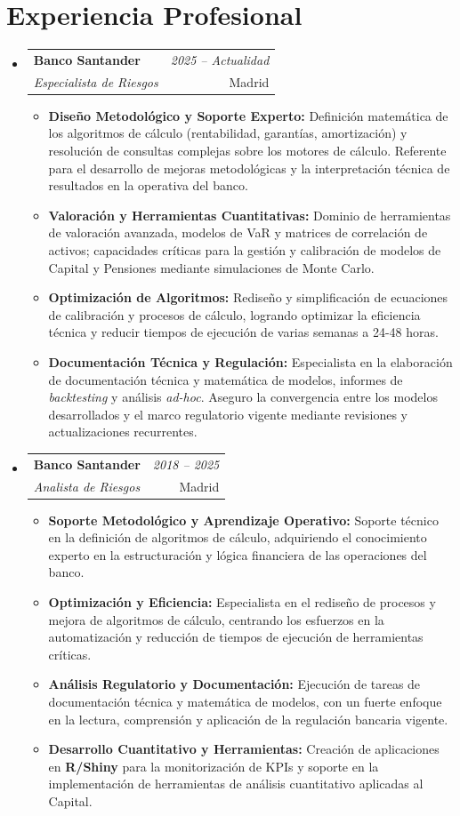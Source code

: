\documentclass[a4paper,12pt]{article}
\makeatletter
\newcommand{\resumeSubheading}[4]{
\vspace{1.5mm}\item 
    \begin{tabular*}{0.98\textwidth}[t]{l@{\extracolsep{\fill}}r}
        \textbf{#1} & \textit{\small #4} \\ 
        \textit{\small #3} &  \small #2\\
    \end{tabular*}
    \vspace{-1.5mm}
}
\newcommand{\resumeItemListStart}{\begin{itemize}[leftmargin=3.5ex, labelsep=1.2mm, itemsep=0.3mm]\small}
\newcommand{\resumeItemListEnd}{\end{itemize}\vspace{-1mm}}
\makeatother
\begin{document}
\section{Experiencia Profesional}
  \begin{itemize}[leftmargin=*,labelsep=0mm]
    \resumeSubheading
      {Banco Santander}{Madrid}
      {Especialista de Riesgos}{2025 -- Actualidad}
      \resumeItemListStart
        \item \textbf{Diseño Metodológico y Soporte Experto:} Definición matemática de los algoritmos de cálculo (rentabilidad, garantías, amortización) y resolución de consultas complejas sobre los motores de cálculo. Referente para el desarrollo de mejoras metodológicas y la interpretación técnica de resultados en la operativa del banco.
        \item \textbf{Valoración y Herramientas Cuantitativas:} Dominio de herramientas de valoración avanzada, modelos de VaR y matrices de correlación de activos; capacidades críticas para la gestión y calibración de modelos de Capital y Pensiones mediante simulaciones de Monte Carlo.
        \item \textbf{Optimización de Algoritmos:} Rediseño y simplificación de ecuaciones de calibración y procesos de cálculo, logrando optimizar la eficiencia técnica y reducir tiempos de ejecución de varias semanas a 24-48 horas.
        \item \textbf{Documentación Técnica y Regulación:} Especialista en la elaboración de documentación técnica y matemática de modelos, informes de \textit{backtesting} y análisis \textit{ad-hoc}. Aseguro la convergencia entre los modelos desarrollados y el marco regulatorio vigente mediante revisiones y actualizaciones recurrentes.
    \resumeItemListEnd
    
    \resumeSubheading
      {Banco Santander}{Madrid}
      {Analista de Riesgos}{2018 -- 2025}
      \resumeItemListStart
       \item \textbf{Soporte Metodológico y Aprendizaje Operativo:} Soporte técnico en la definición de algoritmos de cálculo, adquiriendo el conocimiento experto en la estructuración y lógica financiera de las operaciones del banco.
       \item \textbf{Optimización y Eficiencia:} Especialista en el rediseño de procesos y mejora de algoritmos de cálculo, centrando los esfuerzos en la automatización y reducción de tiempos de ejecución de herramientas críticas.
       \item \textbf{Análisis Regulatorio y Documentación:} Ejecución de tareas de documentación técnica y matemática de modelos, con un fuerte enfoque en la lectura, comprensión y aplicación de la regulación bancaria vigente.
       \item \textbf{Desarrollo Cuantitativo y Herramientas:} Creación de aplicaciones en \textbf{R/Shiny} para la monitorización de KPIs y soporte en la implementación de herramientas de análisis cuantitativo aplicadas al Capital.
      \resumeItemListEnd


\end{itemize}
\end{document}
